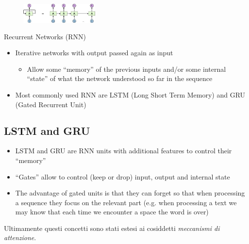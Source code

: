  \begin{figure}
	\includegraphics[width=0.35\textwidth]{figure_ml/t_invariance.png}
\end{figure}

Recurrent Networks (RNN)
\begin{itemize}
	\item Iterative networks with output passed again as input
	\begin{itemize}
		\item Allow some “memory” of the previous inputs and/or some internal “state” of what the network understood so far in the sequence
	\end{itemize}
	\item Most commonly used RNN are LSTM (Long Short Term Memory) and GRU (Gated Recurrent Unit)
\end{itemize}

\subsection{LSTM and GRU}
\begin{itemize}
	\item LSTM and GRU are RNN units with additional features to control their “memory”
	\item “Gates” allow to control (keep or drop) input, output and internal state
	\item The advantage of gated units is that they can forget so
	that when processing a sequence they focus on the
	relevant part (e.g. when processing a text we may know that each time we encounter a space the word is over)
\end{itemize}

Ultimamente questi concetti sono stati estesi ai cosiddetti \textit{meccanismi di attenzione}.


